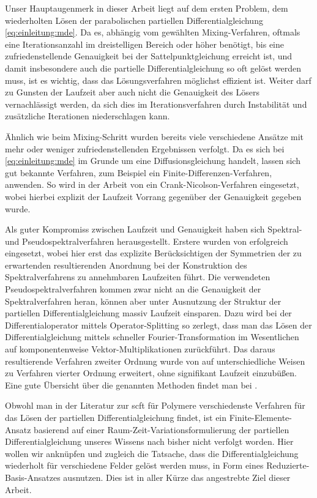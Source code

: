 Unser Hauptaugenmerk in dieser Arbeit liegt auf dem ersten Problem, dem wiederholten Lösen der parabolischen partiellen Differentialgleichung \eqref{eq:einleitung:mde}.
Da es, abhängig vom gewählten Mixing-Verfahren, oftmals eine Iterationsanzahl im dreistelligen Bereich oder höher benötigt, bis eine zufriedenstellende Genauigkeit bei der Sattelpunktgleichung erreicht ist, und damit insbesondere auch die partielle Differentialgleichung so oft gelöst werden muss, ist es wichtig, dass das Lösungsverfahren möglichst effizient ist.
Weiter darf zu Gunsten der Laufzeit aber auch nicht die Genauigkeit des Lösers vernachlässigt werden, da sich dies im Iterationsverfahren durch Instabilität und zusätzliche Iterationen niederschlagen kann.

Ähnlich wie beim Mixing-Schritt wurden bereits viele verschiedene Ansätze mit mehr oder weniger zufriedenstellenden Ergebnissen verfolgt.
Da es sich bei \eqref{eq:einleitung:mde} im Grunde um eine Diffusionsgleichung handelt, lassen sich gut bekannte Verfahren, zum Beispiel ein Finite-Differenzen-Verfahren, anwenden.
So wird in der Arbeit von \textcite{Drolet:1999bs} ein Crank-Nicolson-Verfahren eingesetzt, wobei hierbei explizit der Laufzeit Vorrang gegenüber der Genauigkeit gegeben wurde.

Als guter Kompromiss zwischen Laufzeit und Genauigkeit haben sich Spektral- und Pseudospektralverfahren herausgestellt.
Erstere wurden von \textcite{Matsen:1994bz} erfolgreich eingesetzt, wobei hier erst das explizite Berücksichtigen der Symmetrien der zu erwartenden resultierenden Anordnung bei der Konstruktion des Spektralverfahrens zu annehmbaren Laufzeiten führt.
Die verwendeten Pseudospektralverfahren kommen zwar nicht an die Genauigkeit der Spektralverfahren heran, können aber unter Ausnutzung der Struktur der partiellen Differentialgleichung massiv Laufzeit einsparen.
Dazu wird bei \textcite{Rasmussen:2002kt} der Differentialoperator mittels Operator-Splitting so zerlegt, dass man das Lösen der Differentialgleichung mittels schneller Fourier-Transformation im Wesentlichen auf komponentenweise Vektor-Multiplikationen zurückführt.
Das daraus resultierende Verfahren zweiter Ordnung wurde von \textcite{GarciaCervera:2006uu,Ranjan:2007kl} auf unterschiedliche Weisen zu Verfahren vierter Ordnung erweitert, ohne signifikant Laufzeit einzubüßen.
Eine gute Übersicht über die genannten Methoden findet man bei \textcite[Section 3.6]{Fredrickson:2006th}.

Obwohl man in der Literatur zur \ac{scft} für Polymere verschiedenste Verfahren für das Lösen der partiellen Differentialgleichung findet, ist ein Finite-Elemente-Ansatz basierend auf einer Raum-Zeit-Variationsformulierung der partiellen Differentialgleichung unseres Wissens nach bisher nicht verfolgt worden.
Hier wollen wir anknüpfen und zugleich die Tatsache, dass die Differentialgleichung wiederholt für verschiedene Felder gelöst werden muss, in Form eines Reduzierte-Basis-Ansatzes ausnutzen.
Dies ist in aller Kürze das angestrebte Ziel dieser Arbeit.

